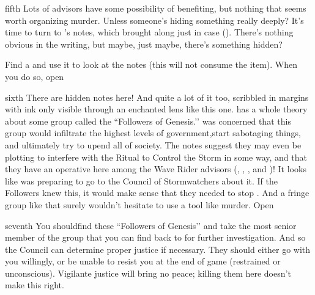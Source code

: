 \documentclass[notebook]{GL2020} %
\begin{document}
\begin{page}{fifth}
Lots of advisors have some possibility of benefiting, but nothing that seems worth organizing murder. Unless someone’s hiding something really deeply? It’s time to turn to \cHeadDiplomat{}’s notes, which \cJuniorStatesman{} brought along just in case (\iMadroneNotes{}). There’s nothing obvious in the writing, but maybe, just maybe, there’s something hidden?

Find a \iCrystalLens{} and use it to look at the notes (this will not consume the item). When you do so, open 
\end{page}

\begin{page}{sixth}
There are hidden notes here! And quite a lot of it too, scribbled in margins with ink only visible through an enchanted lens like this one. \cHeadDiplomat{} has a whole theory about some group called the ``Followers of Genesis.’’ \cHeadDiplomat{} was concerned that this group would infiltrate the highest levels of government,start sabotaging things, and ultimately try to upend all of \pShippie{} society. The notes suggest they may even be plotting to interfere with the Ritual to Control the Storm in some way, and that they have an operative here among the Wave Rider advisors (\cEbbPriest{}, \cChupLeader{}, \cBunker{}, and \cJuniorStatesman{})! It looks like \cHeadDiplomat{} was preparing to go to the Council of Stormwatchers about it. If the Followers knew this, it would make sense that they needed to stop \cHeadDiplomat{}. And a fringe group like that surely wouldn’t hesitate to use a tool like murder. Open 
\end{page}

\begin{page}{seventh}
You shouldfind these ``Followers of Genesis’’ and take the most senior member of the group that you can find back to \pShip{} for further investigation. And so the Council can determine proper justice if necessary. They should either go with you willingly, or be unable to resist you at the end of game (restrained or unconscious). Vigilante justice will bring no peace; killing them here doesn’t make this right.
\end{page}

\endnotebook
\end{document}

